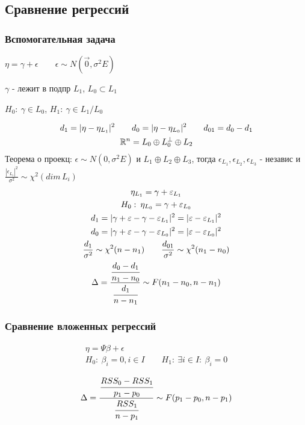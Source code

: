 \documentclass{article}
\begin{document}
\subsection{Сравнение регрессий}
\subsubsection{Вспомогательная задача}

$\eta = \gamma + \epsilon \qquad \epsilon \sim N(\vec{0}, \sigma^{2}E)$

$\gamma$ - лежит в подпр $L_1$, $L_0 \subset L_1$

$H_0: \: \gamma \in L_0$, $H_1: \: \gamma \in L_1/L_0$

\begin{gather*}
  d_1=|\eta-\eta_{L_1}|^{2} \qquad d_0=|\eta-\eta_{L_0}|^{2} \qquad d_{01}=d_0 -d_1 \\ 
  \R^{n}=L_0 \oplus L_0^{\perp} \oplus L_2
\end{gather*}
Теорема о проекц: $\epsilon \sim N(0, \sigma^{2} E)$ и $L_1 \oplus L_2 \oplus L_3$,
тогда $\epsilon_{L_1},\epsilon_{L_2},\epsilon_{L_3}$ - независ и $\frac{|\epsilon_{L_i}|^{2}}{\sigma^{2}} \sim \chi^{2}(dim \, L_i)$
\begin{gather*}
  \eta_{L_1}=\gamma + \epsilon_{L_1} \\ 
  H_0: \: \eta_{L_0}=\gamma + \epsilon_{L_0} \\ 
  d_1 = |\gamma + \epsilon - \gamma - \epsilon_{L_1}|^{2}= |\epsilon - \epsilon_{L_1}|^{2} \\ 
  d_0 = |\gamma + \epsilon - \gamma - \epsilon_{L_0}|^{2} = |\epsilon - \epsilon_{L_0}|^{2} \\ 
  \frac{d_1}{\sigma^{2}} \sim \chi^{2}(n-n_1) \qquad \frac{d_{01}}{\sigma^{2}} \sim \chi^{2}(n_1-n_0) \\ 
  \Delta = \frac{\cfrac{d_0-d_1}{n_1-n_0}}{\cfrac{d_1}{n-n_1}} \sim F(n_1 - n_0, n - n_1)
\end{gather*}

\subsubsection{Сравнение вложенных регрессий}
\begin{gather*}
  \eta = \Psi \beta + \epsilon \\ 
  H_0: \: \beta_i = 0, i\in I \qquad H_1: \: \exists i\in I: \: \beta_i=0
\end{gather*}

\[
  \Delta = \frac{\cfrac{RSS_0-RSS_1}{p_1-p_0}}{\cfrac{RSS_1}{n-p_1}} \sim F(p_1-p_0,n-p_1)
\]
\end{document}
